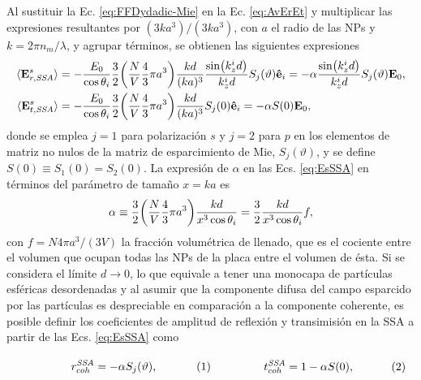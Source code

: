 Al sustituir la Ec. \eqref{eq:FFDydadic-Mie} en la Ec. \eqref{eq:AvErEt} y multiplicar las expresiones resultantes por $(3ka^3)/(3ka^3)$, con $a$ el radio de las NPs y $k = 2\pi n_m /\lambda$, y agrupar términos, se obtienen las siguientes expresiones 
%
	\begin{subequations}\begin{align}
		\langle \vb{E}^s_{r,\textit{SSA}}\rangle & = - \frac{E_0}{\cos\theta_i} \frac32  \qty(\frac{N}{V} \frac43\pi a^3)\frac{kd}{(ka)^3}   \frac{\sin(k_z^id)}{k_z^i d}  S_j(\vartheta)\vu{e}_i =
		-\alpha  \frac{\sin(k_z^id)}{k_z^i d}   S_j(\vartheta) \vb{E}_0,
		\label{eqs:EsSSAr}\\
	\langle \vb{E}^s_{t,\textit{SSA}}\rangle &=  - \frac{E_0}{\cos\theta_i} \frac32
						 \qty(\frac{N}{V}\frac43\pi a^3  ) \frac{kd}{(ka)^3}  S_j(0) \vu{e}_i  
						 = - \alpha S(0) \vb{E}_0,
		\label{eqs:EsSSAt}
	\end{align}\label{eq:EsSSA}\end{subequations}
%
donde  se emplea $j=1$ para polarización $s$ y $j=2$ para $p$ en los elementos de matriz no nulos de la matriz de esparcimiento de Mie, $S_j(\vartheta)$, y se define $S(0) \equiv S_1(0)=S_2(0)$. La expresión de $\alpha$ en las Ecs. \eqref{eq:EsSSA} en términos del parámetro de tamaño $x=ka$ es
%
\begin{align*}
	\alpha \equiv \frac32 \qty(\frac{N}{V}\frac43 \pi a^3  )\frac{kd}{x^3\cos\theta_i} = \frac32\frac{kd}{ x^3\cos\theta_i} f,
	\end{align*}
%
con $f= N 4\pi a^3/(3V)$ la fracción volumétrica de llenado, que es el cociente entre el volumen que ocupan todas las NPs de la placa entre el volumen de ésta. Si se considera el límite $d\to 0$, lo que equivale a tener una monocapa de partículas esféricas desordenadas y al asumir que la componente difusa del campo esparcido por las partículas es despreciable en comparación a la componente coherente, es posible definir los coeficientes de amplitud de reflexión y transimisión en la SSA a partir de las Ecs. \eqref{eq:EsSSA} como
	
	\begin{subequations}\eqhalf{r_{coh}^{\textit{SSA}} = -\alpha S_j(\vartheta),\label{eq:rcohSSA}}
	\eqhalf{t_{coh}^{\textit{SSA}} = 1 - \alpha S(0),\label{eq:tcohSSA} }
	\label{eqs:rtcohSSA}\end{subequations}\vspace*{-1em}	
	
